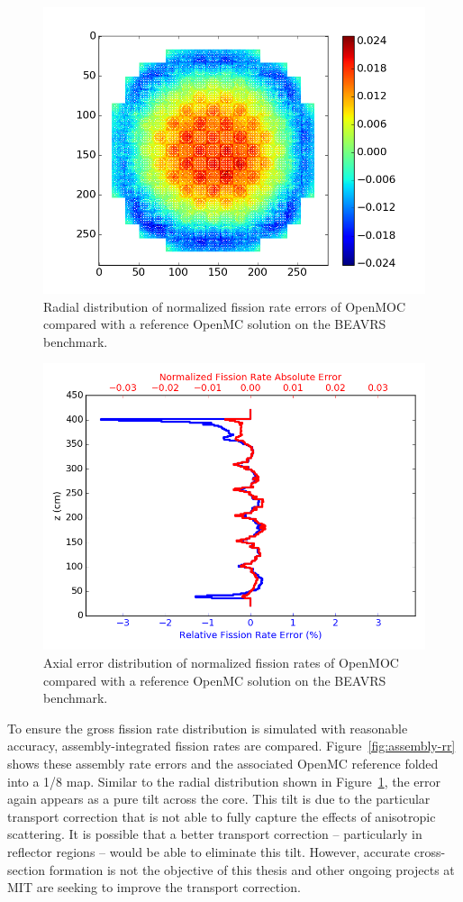 \begin{figure}[ht!]
	\centering
	\includegraphics[width=0.6\linewidth]{figures/results/full-core/radial_diff_v_openmc.png}
	\caption{Radial distribution of normalized fission rate errors of OpenMOC compared with a reference OpenMC solution on the BEAVRS benchmark.}
	\label{fig:openmc-comp-rad}
\end{figure}

\begin{figure}[ht!]
	\centering
	\includegraphics[width=0.7\linewidth]{figures/results/full-core/twin_axial_error.png}
	\caption{Axial error distribution of normalized fission rates of OpenMOC compared with a reference OpenMC solution on the BEAVRS benchmark.}
	\label{fig:openmc-comp-ax}
\end{figure}


To ensure the gross fission rate distribution is simulated with reasonable accuracy, assembly-integrated fission rates are compared. Figure~\ref{fig:assembly-rr} shows these assembly rate errors and the associated OpenMC reference folded into a 1/8 map. Similar to the radial distribution shown in Figure~\ref{fig:openmc-comp-rad}, the error again appears as a pure tilt across the core. This tilt is due to the particular transport correction that is not able to fully capture the effects of anisotropic scattering. It is possible that a better transport correction -- particularly in reflector regions -- would be able to eliminate this tilt. However, accurate cross-section formation is not the objective of this thesis and other ongoing projects at MIT are seeking to improve the transport correction.


